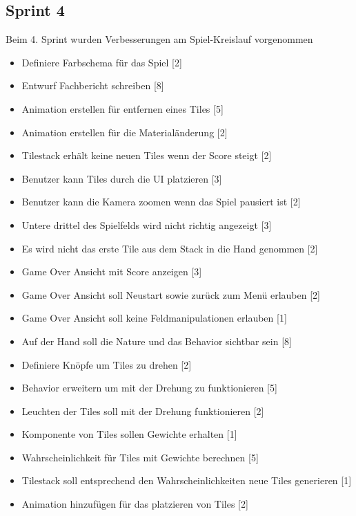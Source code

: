 \documentclass[../main.tex]{subfiles}
\begin{document}
	\newpage
	\subsection{Sprint 4}
	
	\par Beim 4. Sprint wurden Verbesserungen am Spiel-Kreislauf vorgenommen
	
	\begin{itemize}
		\item Definiere Farbschema für das Spiel [2]
		\item Entwurf Fachbericht schreiben [8]
		\item Animation erstellen für entfernen eines Tiles [5]
		\item Animation erstellen für die Materialänderung [2]
		\item Tilestack erhält keine neuen Tiles wenn der Score steigt [2]
		\item Benutzer kann Tiles durch die UI platzieren [3]
		\item Benutzer kann die Kamera zoomen wenn das Spiel pausiert ist [2]
		\item Untere drittel des Spielfelds wird nicht richtig angezeigt [3]
		\item Es wird nicht das erste Tile aus dem Stack in die Hand genommen [2]
		\item Game Over Ansicht mit Score anzeigen [3]
		\item Game Over Ansicht soll Neustart sowie zurück zum Menü erlauben [2]
		\item Game Over Ansicht soll keine Feldmanipulationen erlauben [1]
		\item Auf der Hand soll die Nature und das Behavior sichtbar sein [8]
		\item Definiere Knöpfe um Tiles zu drehen [2]
		\item Behavior erweitern um mit der Drehung zu funktionieren [5]
		\item Leuchten der Tiles soll mit der Drehung funktionieren [2]
		\item Komponente von Tiles sollen Gewichte erhalten [1]
		\item Wahrscheinlichkeit für Tiles mit Gewichte berechnen [5]
		\item Tilestack soll entsprechend den Wahrscheinlichkeiten neue Tiles generieren [1]
		\item Animation hinzufügen für das platzieren von Tiles [2]
	\end{itemize} 
\end{document}
